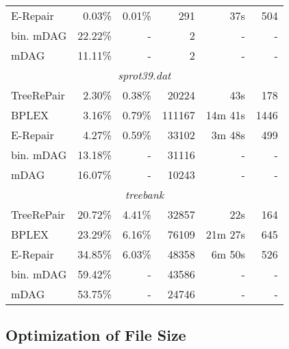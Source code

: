 \documentclass[12pt]{llncs}
\begin{document}
\begin{longtable}{lrrrrr}
			E-Repair&0.03\%&0.01\%&291&37s&504\\*
			bin. mDAG&22.22\%&-&2&-&-\\*
			mDAG&11.11\%&-&2&-&-\\
			\midrule\multicolumn{6}{c}{\emph{sprot39.dat}}\\*
			TreeRePair&2.30\%&0.38\%&20224&43s&178\\*
			BPLEX&3.16\%&0.79\%&111167&14m 41s&1446\\*
			E-Repair&4.27\%&0.59\%&33102&3m 48s&499\\*
			bin. mDAG&13.18\%&-&31116&-&-\\*
			mDAG&16.07\%&-&10243&-&-\\
			\midrule\multicolumn{6}{c}{\emph{treebank}}\\*
			TreeRePair&20.72\%&4.41\%&32857&22s&164\\*
			BPLEX&23.29\%&6.16\%&76109&21m 27s&645\\*
			E-Repair&34.85\%&6.03\%&48358&6m 50s&526\\*
			bin. mDAG&59.42\%&-&43586&-&-\\*
			mDAG&53.75\%&-&24746&-&-\\
			\bottomrule
		\end{longtable}



\newpage

\subsection{Optimization of File Size}\label{sec:detailedResultsOptimizationFileSize}
\end{document}
